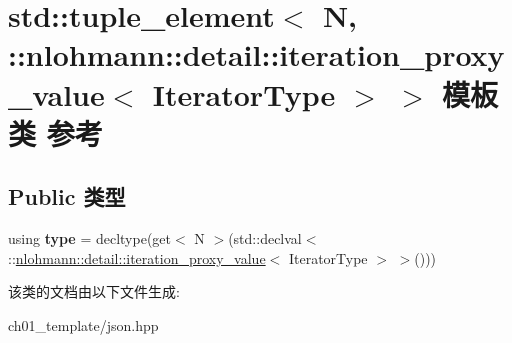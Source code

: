 \hypertarget{classstd_1_1tuple__element_3_01_n_00_01_1_1nlohmann_1_1detail_1_1iteration__proxy__value_3_01_iterator_type_01_4_01_4}{}\section{std\+::tuple\+\_\+element$<$ N, \+::nlohmann\+::detail\+::iteration\+\_\+proxy\+\_\+value$<$ Iterator\+Type $>$ $>$ 模板类 参考}
\label{classstd_1_1tuple__element_3_01_n_00_01_1_1nlohmann_1_1detail_1_1iteration__proxy__value_3_01_iterator_type_01_4_01_4}
\subsection*{Public 类型}
\begin{DoxyCompactItemize}
\item 
\mbox{\label{classstd_1_1tuple__element_3_01_n_00_01_1_1nlohmann_1_1detail_1_1iteration__proxy__value_3_01_iterator_type_01_4_01_4_ace1dfdb74841c2f58c064a50598188fd}} 
using {\bfseries type} = decltype(get$<$ N $>$(std\+::declval$<$ \+::\mbox{\hyperlink{classnlohmann_1_1detail_1_1iteration__proxy__value}{nlohmann\+::detail\+::iteration\+\_\+proxy\+\_\+value}}$<$ Iterator\+Type $>$ $>$()))
\end{DoxyCompactItemize}


该类的文档由以下文件生成\+:\begin{DoxyCompactItemize}
\item 
ch01\+\_\+template/json.\+hpp\end{DoxyCompactItemize}
